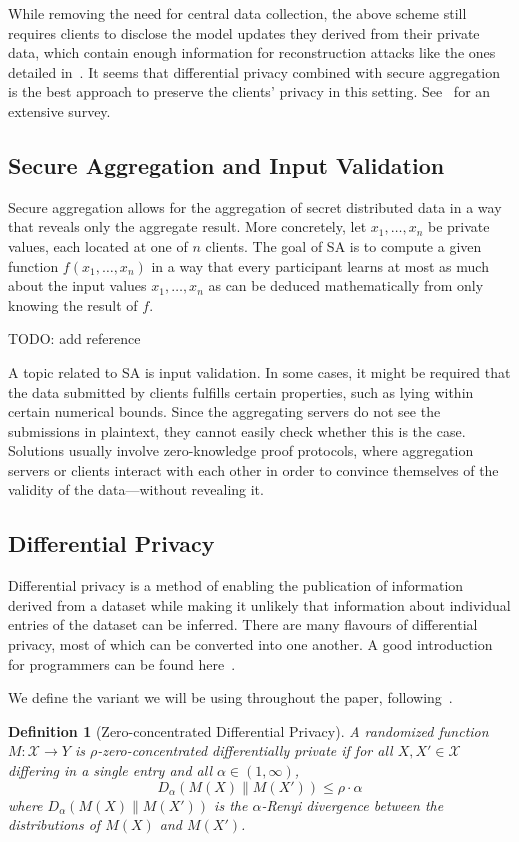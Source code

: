 \documentclass{article}
\newtheorem{definition}{Definition}
\begin{document}
While removing the need for central data collection, the above scheme still
requires clients to disclose the model updates they derived from their private
data, which contain enough information for reconstruction attacks like the ones
detailed in~\cite{7958568,Boenisch2021WhenTC}. It seems that differential
privacy combined with secure aggregation is the best approach to
preserve the clients' privacy in this setting. See~\cite{fl-survey} for an extensive survey.

\subsection{Secure Aggregation and Input Validation}
Secure aggregation allows for the aggregation of secret distributed data in a
way that reveals only the aggregate result. More concretely, let
$x_1,\ldots,x_n$ be private values, each located at one of $n$ clients. The goal of SA
is to compute a given function $f(x_1,\ldots,x_n)$ in a way that every
participant learns at most as much about the input values $x_1,\ldots,x_n$
as can be deduced mathematically from only knowing the result of $f$.

{\color{red}TODO: add reference}

A topic related to SA is input validation. In some cases, it might be
required that the data submitted by clients fulfills certain properties, such as
lying within certain numerical bounds. Since the aggregating servers
do not see the submissions in plaintext, they cannot easily check whether this
is the case. Solutions usually involve zero-knowledge proof
protocols, where aggregation servers or clients interact with each other in
order to convince themselves of the validity of the data---without revealing it.


\subsection{Differential Privacy}
Differential privacy is a method of enabling the publication of information derived from a dataset while making it unlikely that information about individual entries of the dataset can be inferred. There are many flavours of differential privacy, most of which can be converted into one another. A good introduction for programmers can be found here~\cite{near_abuah_2021}.

We define the variant we will be using throughout the paper, following~\cite{DBLP:journals/corr/BunS16}.
\begin{definition}[Zero-concentrated Differential Privacy]
A randomized function $M: \mathcal X\rightarrow Y$ is $\rho$-zero-concentrated differentially private if for all $X,X'\in \mathcal X$ differing in a single entry and all $\alpha\in(1,\infty)$,
$$D_\alpha(M(X)\|M(X'))\leq \rho\cdot\alpha$$
where $D_\alpha(M(X)\|M(X'))$ is the $\alpha$-Renyi divergence between the distributions of $M(X)$ and $M(X')$.
\end{definition}
\end{document}
